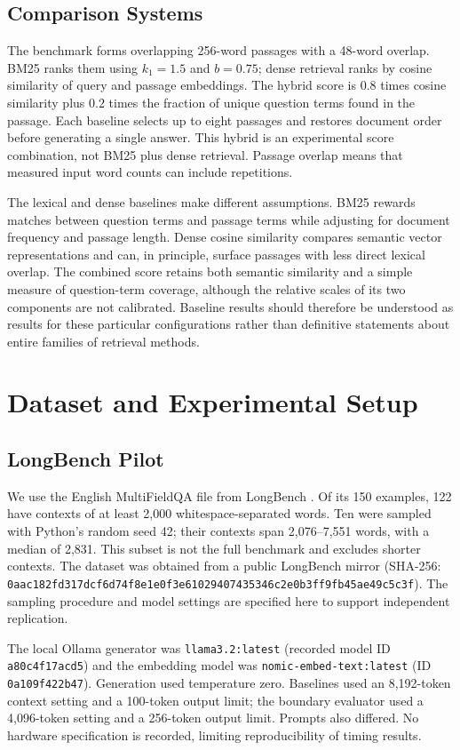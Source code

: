 \documentclass[conference]{IEEEtran}
\begin{document}
\subsection{Comparison Systems}
The benchmark forms overlapping 256-word passages with a 48-word overlap. BM25 ranks them using $k_1=1.5$ and $b=0.75$; dense retrieval ranks by cosine similarity of query and passage embeddings. The hybrid score is $0.8$ times cosine similarity plus $0.2$ times the fraction of unique question terms found in the passage. Each baseline selects up to eight passages and restores document order before generating a single answer. This hybrid is an experimental score combination, not BM25 plus dense retrieval. Passage overlap means that measured input word counts can include repetitions.

The lexical and dense baselines make different assumptions. BM25 rewards matches between question terms and passage terms while adjusting for document frequency and passage length. Dense cosine similarity compares semantic vector representations and can, in principle, surface passages with less direct lexical overlap. The combined score retains both semantic similarity and a simple measure of question-term coverage, although the relative scales of its two components are not calibrated. Baseline results should therefore be understood as results for these particular configurations rather than definitive statements about entire families of retrieval methods.

\section{Dataset and Experimental Setup}
\subsection{LongBench Pilot}
We use the English MultiFieldQA file from LongBench \cite{bai}. Of its 150 examples, 122 have contexts of at least 2,000 whitespace-separated words. Ten were sampled with Python's random seed 42; their contexts span 2,076--7,551 words, with a median of 2,831. This subset is not the full benchmark and excludes shorter contexts. The dataset was obtained from a public LongBench mirror (SHA-256: \texttt{0aac182fd317dcf6d74f8e1e0f3e6102}\allowbreak\texttt{9407435346c2e0b3ff9fb45ae49c5c3f}). The sampling procedure and model settings are specified here to support independent replication.

The local Ollama generator was \texttt{llama3.2:latest} (recorded model ID \texttt{a80c4f17acd5}) and the embedding model was \texttt{nomic-embed-text:latest} (ID \texttt{0a109f422b47}). Generation used temperature zero. Baselines used an 8,192-token context setting and a 100-token output limit; the boundary evaluator used a 4,096-token setting and a 256-token output limit. Prompts also differed. No hardware specification is recorded, limiting reproducibility of timing results.
\end{document}
